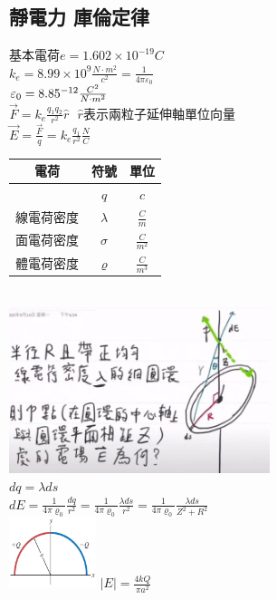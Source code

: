 \documentclass[a4paper,10pt,twocolumn,oneside]{article}
\begin{document}
\begin{normalsize}
\subsection{靜電力 庫倫定律}
$基本電荷 e=1.602\times10^{-19}C$ \\
$k_{e}=8.99\times 10^9 \frac{N\cdot m^2}{c^2}=\frac{1}{4 \pi \varepsilon_{0}}$ \\
$\varepsilon_{0}=8.85\time 10^{-12} \frac{C^2}{N\cdot m^2}$ \\
$\vec{F}=k_{e}\frac{q_{1}q_{2}}{r^2}\hat{r}$  $ $
$ \hat{r}表示兩粒子延伸軸單位向量$ \\
$\vec{E}=\frac{\vec{F}}{q}=k_{e}\frac{q_{1}}{r^2}\frac{N}{C}$ \\
\begin{tabular}{|c|c|c|}
    \hline
    電荷&符號&單位 \\
    \hline
    & $q$ & $c$ \\
    \hline
    線電荷密度& $ \lambda $ & $ \frac{C}{m} $ \\
    \hline
    面電荷密度& $ \sigma $ & $ \frac{C}{m^2} $ \\
    \hline
    體電荷密度& $ \varrho $ & $ \frac{C}{m^3} $ \\
    \hline
\end{tabular} \\
\includegraphics[width=3in]{RingAndCharge.jpg}\\
$dq=\lambda ds$ \\
$dE=\frac{1}{4 \pi \varrho_{0}}\frac{dq}{r^2}=\frac{1}{4 \pi \varrho_{0}}\frac{\lambda ds}{r^2}=\frac{1}{4 \pi \varrho_{0}}\frac{\lambda ds}{Z^2 + R^2}$\\
\includegraphics[width=1in]{21-98.jpg} 
$ |E|=\frac{4kQ}{\pi a^2} $\\

\\

\end{normalsize}
\end{document}
